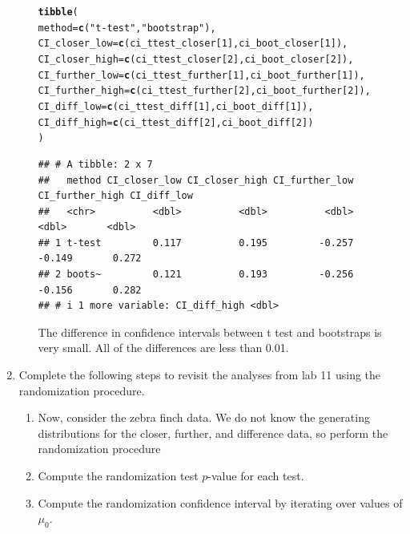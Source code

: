 \documentclass{article}\usepackage[]{graphicx}\usepackage[]{xcolor}
\makeatletter
\newcommand{\hlnum}[1]{\textcolor[rgb]{0.686,0.059,0.569}{#1}}%
\newcommand{\hlsng}[1]{\textcolor[rgb]{0.192,0.494,0.8}{#1}}%
\newcommand{\hldef}[1]{\textcolor[rgb]{0.345,0.345,0.345}{#1}}%
\newcommand{\hlkwc}[1]{\textcolor[rgb]{0.333,0.667,0.333}{#1}}%
\newcommand{\hlkwd}[1]{\textcolor[rgb]{0.737,0.353,0.396}{\textbf{#1}}}%
\newenvironment{kframe}{%
 \def\at@end@of@kframe{}%
 \ifinner\ifhmode%
  \def\at@end@of@kframe{\end{minipage}}%
  \begin{minipage}{\columnwidth}%
 \fi\fi%
 \def\FrameCommand##1{\hskip\@totalleftmargin \hskip-\fboxsep
 \colorbox{shadecolor}{##1}\hskip-\fboxsep
     \hskip-\linewidth \hskip-\@totalleftmargin \hskip\columnwidth}%
 \MakeFramed {\advance\hsize-\width
   \@totalleftmargin\z@ \linewidth\hsize
   \@setminipage}}%
 {\par\unskip\endMakeFramed%
 \at@end@of@kframe}
\newenvironment{knitrout}{}{} %
\makeatother
\begin{document}
\begin{enumerate}
\begin{enumerate}
\begin{knitrout}
\begin{kframe}
\begin{alltt}
\hlkwd{tibble}\hldef{(}
  \hlkwc{method} \hldef{=} \hlkwd{c}\hldef{(}\hlsng{"t-test"}\hldef{,} \hlsng{"bootstrap"}\hldef{),}
  \hlkwc{CI_closer_low} \hldef{=} \hlkwd{c}\hldef{(ci_ttest_closer[}\hlnum{1}\hldef{], ci_boot_closer[}\hlnum{1}\hldef{]),}
  \hlkwc{CI_closer_high} \hldef{=} \hlkwd{c}\hldef{(ci_ttest_closer[}\hlnum{2}\hldef{], ci_boot_closer[}\hlnum{2}\hldef{]),}
  \hlkwc{CI_further_low} \hldef{=} \hlkwd{c}\hldef{(ci_ttest_further[}\hlnum{1}\hldef{], ci_boot_further[}\hlnum{1}\hldef{]),}
  \hlkwc{CI_further_high} \hldef{=} \hlkwd{c}\hldef{(ci_ttest_further[}\hlnum{2}\hldef{], ci_boot_further[}\hlnum{2}\hldef{]),}
  \hlkwc{CI_diff_low} \hldef{=} \hlkwd{c}\hldef{(ci_ttest_diff[}\hlnum{1}\hldef{], ci_boot_diff[}\hlnum{1}\hldef{]),}
  \hlkwc{CI_diff_high} \hldef{=} \hlkwd{c}\hldef{(ci_ttest_diff[}\hlnum{2}\hldef{], ci_boot_diff[}\hlnum{2}\hldef{])}
\hldef{)}
\end{alltt}
\begin{verbatim}
## # A tibble: 2 x 7
##   method CI_closer_low CI_closer_high CI_further_low CI_further_high CI_diff_low
##   <chr>          <dbl>          <dbl>          <dbl>           <dbl>       <dbl>
## 1 t-test         0.117          0.195         -0.257          -0.149       0.272
## 2 boots~         0.121          0.193         -0.256          -0.156       0.282
## # i 1 more variable: CI_diff_high <dbl>
\end{verbatim}
\end{kframe}
\end{knitrout}
The difference in confidence intervals between t test and bootstraps is very small. All of the differences are less than 0.01. 
\end{enumerate}
\item Complete the following steps to revisit the analyses from lab 11 using the
randomization procedure.
\begin{enumerate}
\item Now, consider the zebra finch data. We do not know the generating distributions
for the closer, further, and difference data, so perform the randomization procedure
  \item Compute the randomization test $p$-value for each test.
  \item Compute the randomization confidence interval by iterating over values of $\mu_0$.\\

\end{enumerate}
\end{enumerate}
\end{document}
